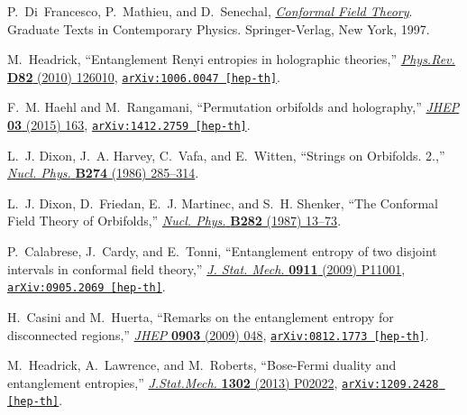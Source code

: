 \begin{thebibliography}{100}
P.~Di~Francesco, P.~Mathieu, and D.~Senechal,
  \href{http://dx.doi.org/10.1007/978-1-4612-2256-9}{{\em {Conformal Field
  Theory}}}.
\newblock Graduate Texts in Contemporary Physics. Springer-Verlag, New York,
1997.
\newblock

M.~Headrick, ``{Entanglement Renyi entropies in holographic theories},''
  \href{http://dx.doi.org/10.1103/PhysRevD.82.126010}{{\em Phys.Rev.} {\bf D82}
  (2010)  126010},
\href{http://arxiv.org/abs/1006.0047}{{\tt arXiv:1006.0047 [hep-th]}}.

F.~M. Haehl and M.~Rangamani, ``{Permutation orbifolds and holography},''
  \href{http://dx.doi.org/10.1007/JHEP03(2015)163}{{\em JHEP} {\bf 03} (2015)
  163},
\href{http://arxiv.org/abs/1412.2759}{{\tt arXiv:1412.2759 [hep-th]}}.

L.~J. Dixon, J.~A. Harvey, C.~Vafa, and E.~Witten, ``{Strings on Orbifolds.
  2.},''
\href{http://dx.doi.org/10.1016/0550-3213(86)90287-7}{{\em Nucl. Phys.} {\bf
  B274} (1986)  285--314}.

L.~J. Dixon, D.~Friedan, E.~J. Martinec, and S.~H. Shenker, ``{The Conformal
  Field Theory of Orbifolds},''
\href{http://dx.doi.org/10.1016/0550-3213(87)90676-6}{{\em Nucl. Phys.} {\bf
  B282} (1987)  13--73}.

P.~Calabrese, J.~Cardy, and E.~Tonni, ``{Entanglement entropy of two disjoint
  intervals in conformal field theory},''
  \href{http://dx.doi.org/10.1088/1742-5468/2009/11/P11001}{{\em J. Stat.
  Mech.} {\bf 0911} (2009)  P11001},
\href{http://arxiv.org/abs/0905.2069}{{\tt arXiv:0905.2069 [hep-th]}}.

H.~Casini and M.~Huerta, ``{Remarks on the entanglement entropy for
  disconnected regions},''
  \href{http://dx.doi.org/10.1088/1126-6708/2009/03/048}{{\em JHEP} {\bf 0903}
  (2009)  048},
\href{http://arxiv.org/abs/0812.1773}{{\tt arXiv:0812.1773 [hep-th]}}.

M.~Headrick, A.~Lawrence, and M.~Roberts, ``{Bose-Fermi duality and
  entanglement entropies},''
  \href{http://dx.doi.org/10.1088/1742-5468/2013/02/P02022}{{\em J.Stat.Mech.}
  {\bf 1302} (2013)  P02022},
\href{http://arxiv.org/abs/1209.2428}{{\tt arXiv:1209.2428 [hep-th]}}.


\end{thebibliography}
